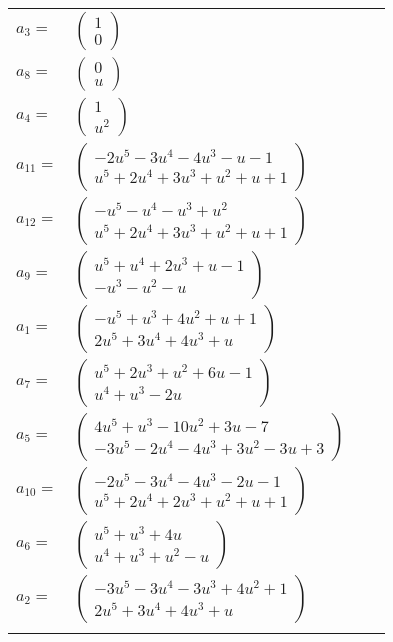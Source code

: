 \documentclass[1p]{elsarticle_modified}
\theoremstyle{definition}
\begin{document}
\begin{tabular}{m{7pt} m{180pt} m{7pt} m{180pt} }
\flushright $a_{3}=$&$\begin{pmatrix}1\\0\end{pmatrix}$ \\
\flushright $a_{8}=$&$\begin{pmatrix}0\\u\end{pmatrix}$ \\
\flushright $a_{4}=$&$\begin{pmatrix}1\\u^2\end{pmatrix}$ \\
\flushright $a_{11}=$&$\begin{pmatrix}-2 u^5-3 u^4-4 u^3- u-1\\u^5+2 u^4+3 u^3+u^2+u+1\end{pmatrix}$ \\
\flushright $a_{12}=$&$\begin{pmatrix}- u^5- u^4- u^3+u^2\\u^5+2 u^4+3 u^3+u^2+u+1\end{pmatrix}$ \\
\flushright $a_{9}=$&$\begin{pmatrix}u^5+u^4+2 u^3+u-1\\- u^3- u^2- u\end{pmatrix}$ \\
\flushright $a_{1}=$&$\begin{pmatrix}- u^5+u^3+4 u^2+u+1\\2 u^5+3 u^4+4 u^3+u\end{pmatrix}$ \\
\flushright $a_{7}=$&$\begin{pmatrix}u^5+2 u^3+u^2+6 u-1\\u^4+u^3-2 u\end{pmatrix}$ \\
\flushright $a_{5}=$&$\begin{pmatrix}4 u^5+u^3-10 u^2+3 u-7\\-3 u^5-2 u^4-4 u^3+3 u^2-3 u+3\end{pmatrix}$ \\
\flushright $a_{10}=$&$\begin{pmatrix}-2 u^5-3 u^4-4 u^3-2 u-1\\u^5+2 u^4+2 u^3+u^2+u+1\end{pmatrix}$ \\
\flushright $a_{6}=$&$\begin{pmatrix}u^5+u^3+4 u\\u^4+u^3+u^2- u\end{pmatrix}$ \\
\flushright $a_{2}=$&$\begin{pmatrix}-3 u^5-3 u^4-3 u^3+4 u^2+1\\2 u^5+3 u^4+4 u^3+u\end{pmatrix}$\\&\end{tabular}
\end{document}

